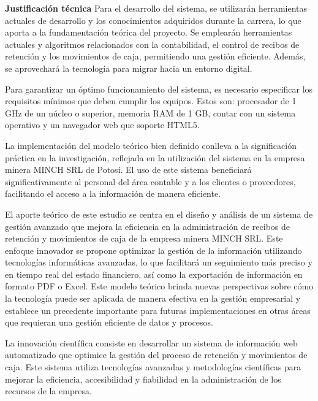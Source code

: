 \documentclass[stu]{apa7}
\begin{document}
\textbf{Justificación técnica} Para el desarrollo del sistema, se utilizarán herramientas actuales de desarrollo y los conocimientos adquiridos durante la carrera, lo que aporta a la fundamentación teórica del proyecto. Se emplearán herramientas actuales y algoritmos relacionados con la contabilidad, el control de recibos de retención y los movimientos de caja, permitiendo una gestión eficiente. Además, se aprovechará la tecnología para migrar hacia un entorno digital.

Para garantizar un óptimo funcionamiento del sistema, es necesario especificar los requisitos mínimos que deben cumplir los equipos. Estos son: procesador de 1 GHz de un núcleo o superior, memoria RAM de 1 GB, contar con un sistema operativo y un navegador web que soporte HTML5.

La implementación del modelo teórico bien definido conlleva a la significación práctica en la investigación, reflejada en la utilización del sistema en la empresa minera MINCH SRL de Potosí. El uso de este sistema beneficiará significativamente al personal del área contable y a los clientes o proveedores, facilitando el acceso a la información de manera eficiente.

El aporte teórico de este estudio se centra en el diseño y análisis de un sistema de gestión avanzado que mejora la eficiencia en la administración de recibos de retención y movimientos de caja de la empresa minera MINCH SRL. Este enfoque innovador se propone optimizar la gestión de la información utilizando tecnologías informáticas avanzadas, lo que facilitará un seguimiento más preciso y en tiempo real del estado financiero, así como la exportación de información en formato PDF o Excel. Este modelo teórico brinda nuevas perspectivas sobre cómo la tecnología puede ser aplicada de manera efectiva en la gestión empresarial y establece un precedente importante para futuras implementaciones en otras áreas que requieran una gestión eficiente de datos y procesos.

La innovación científica consiste en desarrollar un sistema de información web automatizado que optimice la gestión del proceso de retención y movimientos de caja. Este sistema utiliza tecnologías avanzadas y metodologías científicas para mejorar la eficiencia, accesibilidad y fiabilidad en la administración de los recursos de la empresa.
\end{document}
